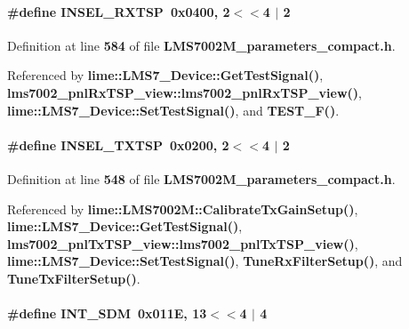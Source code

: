 \paragraph[{I\+N\+S\+E\+L\+\_\+\+R\+X\+T\+SP}]{\setlength{\rightskip}{0pt plus 5cm}\#define I\+N\+S\+E\+L\+\_\+\+R\+X\+T\+SP~0x0400, 2$<$$<$4 $\vert$  2}\label{LMS7002M__parameters__compact_8h_a67c5082dedcbfe10d769c0bcb2fe58ac}


Definition at line {\bf 584} of file {\bf L\+M\+S7002\+M\+\_\+parameters\+\_\+compact.\+h}.



Referenced by {\bf lime\+::\+L\+M\+S7\+\_\+\+Device\+::\+Get\+Test\+Signal()}, {\bf lms7002\+\_\+pnl\+Rx\+T\+S\+P\+\_\+view\+::lms7002\+\_\+pnl\+Rx\+T\+S\+P\+\_\+view()}, {\bf lime\+::\+L\+M\+S7\+\_\+\+Device\+::\+Set\+Test\+Signal()}, and {\bf T\+E\+S\+T\+\_\+\+F()}.

\paragraph[{I\+N\+S\+E\+L\+\_\+\+T\+X\+T\+SP}]{\setlength{\rightskip}{0pt plus 5cm}\#define I\+N\+S\+E\+L\+\_\+\+T\+X\+T\+SP~0x0200, 2$<$$<$4 $\vert$  2}\label{LMS7002M__parameters__compact_8h_a87088d13ddb76f4171d695c06ccd156c}


Definition at line {\bf 548} of file {\bf L\+M\+S7002\+M\+\_\+parameters\+\_\+compact.\+h}.



Referenced by {\bf lime\+::\+L\+M\+S7002\+M\+::\+Calibrate\+Tx\+Gain\+Setup()}, {\bf lime\+::\+L\+M\+S7\+\_\+\+Device\+::\+Get\+Test\+Signal()}, {\bf lms7002\+\_\+pnl\+Tx\+T\+S\+P\+\_\+view\+::lms7002\+\_\+pnl\+Tx\+T\+S\+P\+\_\+view()}, {\bf lime\+::\+L\+M\+S7\+\_\+\+Device\+::\+Set\+Test\+Signal()}, {\bf Tune\+Rx\+Filter\+Setup()}, and {\bf Tune\+Tx\+Filter\+Setup()}.

\paragraph[{I\+N\+T\+\_\+\+S\+DM}]{\setlength{\rightskip}{0pt plus 5cm}\#define I\+N\+T\+\_\+\+S\+DM~0x011\+E, 13$<$$<$4 $\vert$  4}\label{LMS7002M__parameters__compact_8h_a992efa7c33a0295109180621310825c7}


